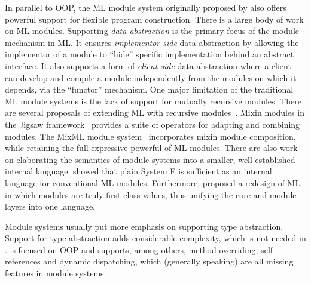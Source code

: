In parallel to OOP, the ML module system originally proposed by
\citet{MacQueen_1984} also offers powerful support for flexible program
construction. There is a large body of work on ML modules. Supporting
\textit{data abstraction} is the primary focus of the module mechanism in ML. It
ensures \textit{implementor-side} data abstraction by allowing the implementor
of a module to ``hide'' specific implementation behind an abstract interface. It
also supports a form of \textit{client-side} data abstraction where a client can
develop and compile a module independently from the modules on which it depends,
via the ``functor'' mechanism. One major limitation of the traditional ML module
systems is the lack of support for mutually recursive modules. There are several
proposals of extending ML with recursive
modules~\citep{Crary_1999,Rossberg_2013, Russo_2001}. Mixin modules in the
Jigsaw framework~\citep{Bracha92modularitymeets} provides a suite of operators
for adapting and combining modules. The MixML module
system~\citep{Rossberg_2013} incorporates mixin module composition, while
retaining the full expressive powerful of ML modules. There are also work on
elaborating the semantics of module systems into a smaller, well-established
internal language. \citet{ROSSBERG_2014} showed that plain System F is
sufficient as an internal language for conventional ML modules.
Furthermore, \citet{Rossberg_2015} proposed a redesign of ML in which modules are truly
first-class values, thus unifying the core and module layers into one language.

Module systems usually put more emphasis on supporting type abstraction. Support
for type abstraction adds considerable complexity, which is not needed in
\sedel. \sedel is focused on OOP and supports, among others, method overriding,
self references and dynamic dispatching, which (generally speaking) are all
missing features in module systems.





